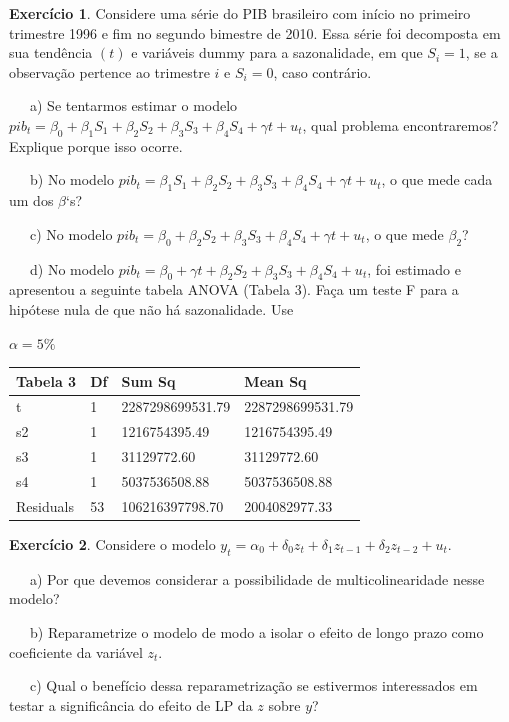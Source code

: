 \documentclass[
]{book}
\theoremstyle{definition}
\theoremstyle{definition}
\theoremstyle{definition}
\newtheorem{exercise}{Exercício}[chapter]
\theoremstyle{remark}
\begin{document}
\begin{exercise}
\protect\hypertarget{exr:exsr5}{}{\label{exr:exsr5} }Considere uma série do PIB brasileiro com início no primeiro trimestre 1996 e fim no segundo bimestre de 2010. Essa série foi decomposta em sua tendência \((t)\) e variáveis dummy para a sazonalidade, em que \(S_i = 1\), se a observação pertence ao trimestre \(i\) e \(S_i = 0\), caso contrário.

~~~a) Se tentarmos estimar o modelo \(pib_t=\beta_0+\beta_1S_1+\beta_2S_2+\beta_3S_3+\beta_4S_4+\gamma t+u_t\), qual problema encontraremos? Explique porque isso ocorre.

~~~b) No modelo \(pib_t=\beta_1S_1+\beta_2S_2+\beta_3S_3+\beta_4S_4+\gamma t+u_t\), o que mede cada um dos \(\beta\)`s?

~~~c) No modelo \(pib_t=\beta_0+\beta_2S_2+\beta_3S_3+\beta_4S_4+\gamma t+u_t\), o que mede \(\beta_2\)?

~~~d) No modelo \(pib_t=\beta_0+\gamma t+\beta_2S_2+\beta_3S_3+\beta_4S_4+u_t\), foi estimado e apresentou a seguinte tabela ANOVA (Tabela 3). Faça um teste F para a hipótese nula de que não há sazonalidade. Use

\(\alpha=5\%\)

\begin{longtable}[]{@{}llll@{}}
\toprule
Tabela 3 & Df & Sum Sq & Mean Sq\tabularnewline
\midrule
\endhead
t & 1 & 2287298699531.79 & 2287298699531.79\tabularnewline
s2 & 1 & 1216754395.49 & 1216754395.49\tabularnewline
s3 & 1 & 31129772.60 & 31129772.60\tabularnewline
s4 & 1 & 5037536508.88 & 5037536508.88\tabularnewline
Residuals & 53 & 106216397798.70 & 2004082977.33\tabularnewline
\bottomrule
\end{longtable}
\end{exercise}

\begin{exercise}
\protect\hypertarget{exr:exsr6}{}{\label{exr:exsr6} }Considere o modelo \(y_t=\alpha_0+\delta_0z_t+\delta_1z_{t-1}+\delta_2z_{t-2}+u_t\).

~~~a) Por que devemos considerar a possibilidade de multicolinearidade nesse modelo?

~~~b) Reparametrize o modelo de modo a isolar o efeito de longo prazo como coeficiente da variável \(z_t\).

~~~c) Qual o benefício dessa reparametrização se estivermos interessados em testar a significância do efeito de LP da \(z\) sobre \(y\)?
\end{exercise}
\end{document}
